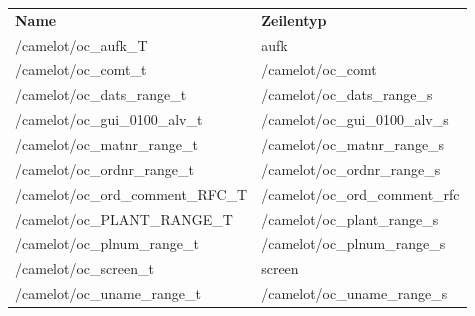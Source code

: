 \begin{tabu}{p{0.47\textwidth}p{0.46\textwidth }}
\rowfont{\bfseries\leavevmode\color{headingfont}}\textbf{Name} & \textbf{Zeilentyp} \\
/camelot/oc\_aufk\_T & aufk \\
/camelot/oc\_comt\_t & /camelot/oc\_comt \\
/camelot/oc\_dats\_range\_t & /camelot/oc\_dats\_range\_s \\
	/camelot/oc\_gui\_0100\_alv\_t & /camelot/oc\_gui\_0100\_alv\_s \\
/camelot/oc\_matnr\_range\_t & /camelot/oc\_matnr\_range\_s \\
/camelot/oc\_ordnr\_range\_t & /camelot/oc\_ordnr\_range\_s \\
/camelot/oc\_ord\_comment\_RFC\_T & /camelot/oc\_ord\_comment\_rfc \\
/camelot/oc\_PLANT\_RANGE\_T & /camelot/oc\_plant\_range\_s \\
/camelot/oc\_plnum\_range\_t & /camelot/oc\_plnum\_range\_s \\
/camelot/oc\_screen\_t & screen \\
/camelot/oc\_uname\_range\_t & /camelot/oc\_uname\_range\_s \\
\end{tabu}